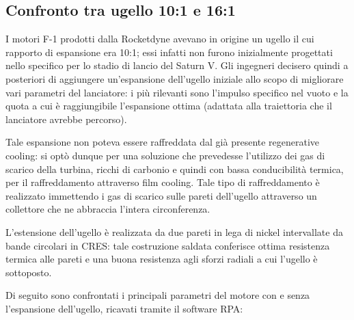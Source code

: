 \subsection{Confronto tra ugello 10:1 e 16:1}
\label{subsec:confronto ugello}

I motori F-1 prodotti dalla Rocketdyne avevano in origine un ugello il cui rapporto di espansione era 10:1; essi infatti non furono inizialmente progettati nello specifico per lo stadio di lancio del Saturn V. Gli ingegneri decisero quindi a posteriori di aggiungere un'espansione dell'ugello iniziale allo scopo di migliorare vari parametri del lanciatore: i più rilevanti sono l'impulso specifico nel vuoto e la quota a cui è raggiungibile l'espansione ottima (adattata alla traiettoria che il lanciatore avrebbe percorso).

Tale espansione non poteva essere raffreddata dal già presente regenerative cooling: si optò dunque per una soluzione che prevedesse l'utilizzo dei gas di scarico della turbina, ricchi di carbonio e quindi con bassa conducibilità termica, per il raffreddamento attraverso film cooling. Tale tipo di raffreddamento è realizzato immettendo i gas di scarico sulle pareti dell'ugello attraverso un collettore che ne abbraccia l'intera circonferenza.

L'estensione dell'ugello è realizzata da due pareti in lega di nickel intervallate da bande circolari in CRES: tale costruzione saldata conferisce ottima resistenza termica alle pareti e una buona resistenza agli sforzi radiali a cui l'ugello è sottoposto.

Di seguito sono confrontati i principali parametri del motore con e senza l'espansione dell'ugello, ricavati tramite il software RPA:

